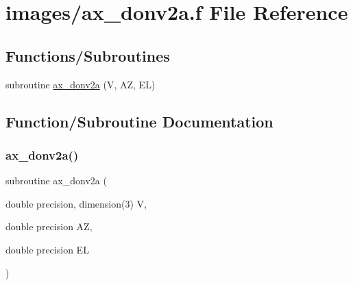 \hypertarget{ax__donv2a_8f}{}\section{images/ax\+\_\+donv2a.f File Reference}
\label{ax__donv2a_8f}
\subsection*{Functions/\+Subroutines}
\begin{DoxyCompactItemize}
\item 
subroutine \hyperlink{ax__donv2a_8f_a0702e9f0139167847898143b5fe748c8}{ax\+\_\+donv2a} (V, AZ, EL)
\end{DoxyCompactItemize}


\subsection{Function/\+Subroutine Documentation}
\mbox{\label{ax__donv2a_8f_a0702e9f0139167847898143b5fe748c8}} 
\subsubsection{\texorpdfstring{ax\+\_\+donv2a()}{ax\_donv2a()}}
{\footnotesize\ttfamily subroutine ax\+\_\+donv2a (\begin{DoxyParamCaption}\item[{double precision, dimension(3)}]{V,  }\item[{double precision}]{AZ,  }\item[{double precision}]{EL }\end{DoxyParamCaption})}

